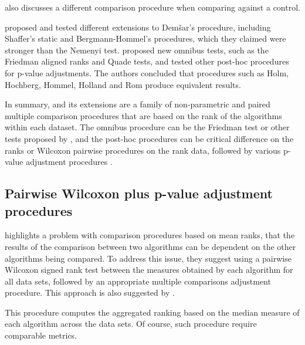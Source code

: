 \documentclass[twoside,11pt,preprint]{article}
\begin{document}
\citet{demsar} also discusses a different comparison procedure when comparing
against a control.

\citet{garcia2008extension} proposed and tested different extensions to Demšar's procedure, including Shaffer's static and Bergmann-Hommel's procedures, which they claimed were stronger than the Nemenyi test. \citet{garcia2010advanced} proposed new omnibus tests, such as the Friedman aligned ranks and Quade tests, and tested other post-hoc procedures for p-value adjustments. The authors concluded that procedures such as Holm, Hochberg, Hommel, Holland and Rom produce equivalent results.

In summary, \citet{demsar} and its extensions are a family of non-parametric
and paired multiple comparison procedures that are based on the rank
of the algorithms within each dataset. The omnibus procedure can be
the Friedman test or other tests proposed by \citet{garcia2010advanced}, and
the post-hoc procedures can be critical difference on the ranks
\citep{demsar, garcia2008extension} or Wilcoxon pairwise procedures on the
rank data, followed by various p-value adjustment procedures
\citep{garcia2010advanced}.

\hypertarget{pairwise-wilcoxon-plus-p-value-adjustment-procedures}{%
\subsection{\texorpdfstring{Pairwise Wilcoxon plus p-value adjustment procedures \label{sec:pairwil}}{Pairwise Wilcoxon plus p-value adjustment procedures }}\label{pairwise-wilcoxon-plus-p-value-adjustment-procedures}}

\citet{benavoli2016should} highlights a problem with comparison procedures based on mean ranks, that the results of the comparison between two algorithms can be dependent on the other algorithms being compared. To address this issue, they suggest using a pairwise Wilcoxon signed rank test between the measures obtained by each algorithm for all data sets, followed by an appropriate multiple comparisons adjustment procedure. This approach is also suggested by \citet{STAPOR2021107219}.

This procedure computes the aggregated ranking based on the median measure of each algorithm across the data sets. Of course, such procedure
require comparable metrics.
\end{document}
